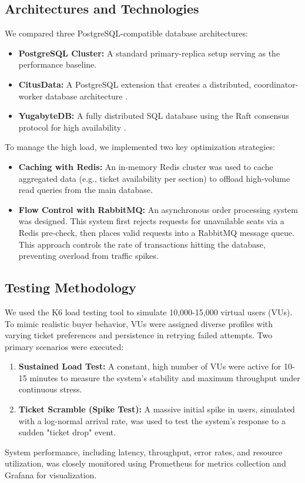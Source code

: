 \documentclass[a0,landscape]{config/poster/a0poster}
\begin{document}
\begin{multicols}{4}
	\subsection*{Architectures and Technologies}
	We compared three PostgreSQL-compatible database architectures:
	\begin{itemize}
		\item \textbf{PostgreSQL Cluster:} A standard primary-replica setup serving as the performance baseline.
		\item \textbf{CitusData:} A PostgreSQL extension that creates a distributed, coordinator-worker database architecture \cite{citus}.
		\item \textbf{YugabyteDB:} A fully distributed SQL database using the Raft consensus protocol for high availability \cite{yugabyte}.
	\end{itemize}

	To manage the high load, we implemented two key optimization strategies:
	\begin{itemize}
		\item \textbf{Caching with Redis:} An in-memory Redis cluster was used to cache aggregated data (e.g., ticket availability per section) to offload high-volume read queries from the main database.
		\item \textbf{Flow Control with RabbitMQ:} An asynchronous order processing system was designed. This system first rejects requests for unavailable seats via a Redis pre-check, then places valid requests into a RabbitMQ message queue. This approach controls the rate of transactions hitting the database, preventing overload from traffic spikes.
	\end{itemize}

	\subsection*{Testing Methodology}
	We used the K6 load testing tool to simulate 10,000-15,000 virtual users (VUs). To mimic realistic buyer behavior, VUs were assigned diverse profiles with varying ticket preferences and persistence in retrying failed attempts. Two primary scenarios were executed:
	\begin{enumerate}
		\item \textbf{Sustained Load Test:} A constant, high number of VUs were active for 10-15 minutes to measure the system's stability and maximum throughput under continuous stress.
		\item \textbf{Ticket Scramble (Spike Test):} A massive initial spike in users, simulated with a log-normal arrival rate, was used to test the system's response to a sudden "ticket drop" event.
	\end{enumerate}
	System performance, including latency, throughput, error rates, and resource utilization, was closely monitored using Prometheus for metrics collection and Grafana for visualization.


\end{multicols}
\end{document}

